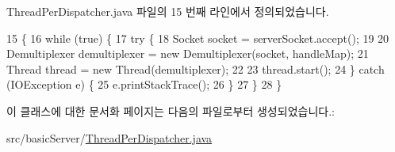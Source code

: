 Thread\+Per\+Dispatcher.\+java 파일의 15 번째 라인에서 정의되었습니다.


\begin{DoxyCode}
15                                                                          \{
16         \textcolor{keywordflow}{while} (\textcolor{keyword}{true}) \{
17             \textcolor{keywordflow}{try} \{
18                 Socket socket = serverSocket.accept();
19 
20                 Demultiplexer demultiplexer = \textcolor{keyword}{new} Demultiplexer(socket, handleMap);
21                 Thread thread = \textcolor{keyword}{new} Thread(demultiplexer);
22 
23                 thread.start();
24             \} \textcolor{keywordflow}{catch} (IOException e) \{
25                 e.printStackTrace();
26             \}
27         \}
28     \}
\end{DoxyCode}


이 클래스에 대한 문서화 페이지는 다음의 파일로부터 생성되었습니다.\+:\begin{DoxyCompactItemize}
\item 
src/basic\+Server/\hyperlink{_thread_per_dispatcher_8java}{Thread\+Per\+Dispatcher.\+java}\end{DoxyCompactItemize}
